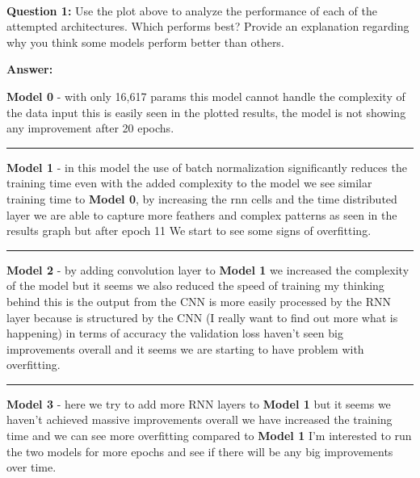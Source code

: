 \documentclass[11pt]{article}
\begin{document}
    \begin{center}
    \end{center}
    { \hspace*{\fill} \\}
    
    \textbf{Question 1:} Use the plot above to analyze the performance of
each of the attempted architectures. Which performs best? Provide an
explanation regarding why you think some models perform better than
others.

\textbf{Answer:}

\textbf{Model 0} - with only 16,617 params this model cannot handle the
complexity of the data input this is easily seen in the plotted results,
the model is not showing any improvement after 20 epochs.

\begin{center}\rule{0.5\linewidth}{\linethickness}\end{center}

\textbf{Model 1} - in this model the use of batch normalization
significantly reduces the training time even with the added complexity
to the model we see similar training time to \textbf{Model 0}, by
increasing the rnn cells and the time distributed layer we are able to
capture more feathers and complex patterns as seen in the results graph
but after epoch 11 We start to see some signs of overfitting.

\begin{center}\rule{0.5\linewidth}{\linethickness}\end{center}

\textbf{Model 2} - by adding convolution layer to \textbf{Model 1} we
increased the complexity of the model but it seems we also reduced the
speed of training my thinking behind this is the output from the CNN is
more easily processed by the RNN layer because is structured by the CNN
(I really want to find out more what is happening) in terms of accuracy
the validation loss haven't seen big improvements overall and it seems
we are starting to have problem with overfitting.

\begin{center}\rule{0.5\linewidth}{\linethickness}\end{center}

\textbf{Model 3} - here we try to add more RNN layers to \textbf{Model
1} but it seems we haven't achieved massive improvements overall we have
increased the training time and we can see more overfitting compared to
\textbf{Model 1} I'm interested to run the two models for more epochs
and see if there will be any big improvements over time.
\end{document}
